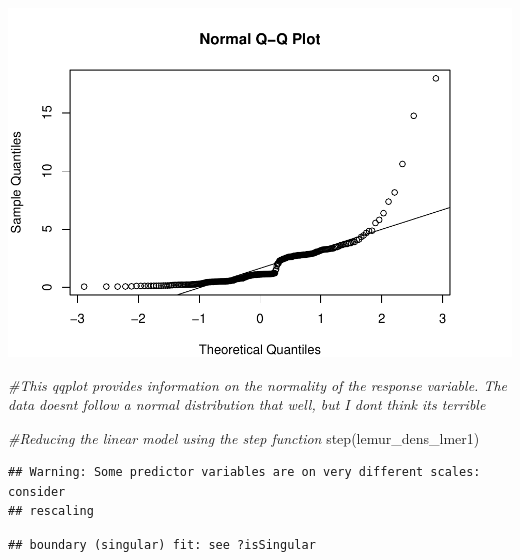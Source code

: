 \documentclass[
  12pt,
]{article}
\newenvironment{Shaded}{\begin{snugshade}}{\end{snugshade}}
\newcommand{\CommentTok}[1]{\textcolor[rgb]{0.56,0.35,0.01}{\textit{#1}}}
\newcommand{\FunctionTok}[1]{\textcolor[rgb]{0.00,0.00,0.00}{#1}}
\newcommand{\NormalTok}[1]{#1}
\begin{document}
\includegraphics{project_draft_files/figure-latex/unnamed-chunk-4-5.pdf}

\begin{Shaded}
\begin{Highlighting}[]
\CommentTok{\#This qqplot provides information on the normality of the response variable. The data doesn\textquotesingle{}t follow a normal distribution that well, but I don\textquotesingle{}t think its terrible}

\CommentTok{\#Reducing the linear model using the step function}
\FunctionTok{step}\NormalTok{(lemur\_dens\_lmer1)}
\end{Highlighting}
\end{Shaded}

\begin{verbatim}
## Warning: Some predictor variables are on very different scales: consider
## rescaling
\end{verbatim}

\begin{verbatim}
## boundary (singular) fit: see ?isSingular
\end{verbatim}
\end{document}
